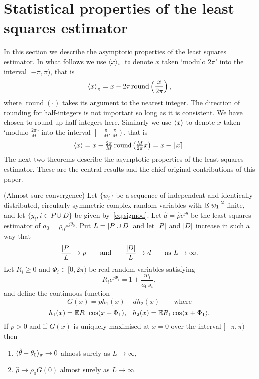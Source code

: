 \documentclass[journal]{IEEEtran}
\begin{document}
\section{Statistical properties of the least squares estimator}\label{sec:stat-prop-least}

In this section we describe the asymptotic properties of the least squares estimator.  In what follows we use $\langle x \rangle_\pi$ to denote $x$ taken `modulo $2\pi$' into the interval $[-\pi, \pi)$, that is
\[
\left\langle x \right\rangle_\pi = x - 2\pi\operatorname{round}\left(\frac{x}{2\pi}\right),
\]
where $\operatorname{round}(\cdot)$ takes its argument to the nearest integer.  The direction of rounding for half-integers is not important so long as it is consistent.  We have chosen to round up half-integers here.  Similarly we use $\langle x \rangle$ to denote $x$ taken `modulo $\tfrac{2\pi}{M}$' into the interval $\left[-\tfrac{\pi}{M}, \tfrac{\pi}{M}\right)$, that is
\[
\left\langle x \right\rangle = x - \tfrac{2\pi}{M}\operatorname{round}\left(\tfrac{M}{2\pi}x\right) = x - {\left\lfloor x \right\rceil}.
\]
The next two theorems describe the asymptotic properties of the least squares estimator.  These are the central results and the chief original contributions of this paper.

\begin{theorem}\label{thm:consistency} (Almost sure convergence)
Let $\{w_i\}$ be a sequence of independent and identically distributed, circularly symmetric complex random variables with ${\mathbb E} {\left\vert w_1 \right\vert}^2$ finite, and let $\{y_i, i \in P \cup D\}$ be given by~\eqref{eq:sigmod}.   Let $\hat{a} = \hat{\rho}e^{j\hat{\theta}}$ be the least squares estimator of $a_0 = \rho_0e^{j\theta_0}$. %
Put $L = {\left\vert P \cup D \right\vert}$ and let ${\left\vert P \right\vert}$ and ${\left\vert D \right\vert}$ increase in such a way that
\[
\frac{{\left\vert P \right\vert}}{L} \rightarrow p \qquad \text{and} \qquad \frac{{\left\vert D \right\vert}}{L} \rightarrow d \qquad \text{as $L \rightarrow \infty$.}
\] 
Let $R_i \geq 0$ and $\Phi_i \in [0,2\pi)$ be real random variables satisfying
\begin{equation}\label{eq:RiandPhii}
R_ie^{j\Phi_i} = 1 + \frac{w_i}{a_0 s_i} ,
\end{equation}
and define the continuous function
\[
G(x) = p h_1(x) + d h_2(x) \qquad \text{where}
\]
\[
h_1(x) = {\mathbb E} R_1 \cos(x + \Phi_1), \;\;\; h_2(x) =  {\mathbb E} R_1 \cos\langle  x + \Phi_1 \rangle.
\]
If $p > 0$ and if $G(x)$ is uniquely maximised at $x = 0$ over the interval $[-\pi,\pi)$ then
\begin{enumerate}
\item $\langle \hat{\theta} - \theta_0 \rangle_\pi \rightarrow 0$ almost surely as $L \rightarrow \infty$,
\item $\hat{\rho} \rightarrow \rho_0 G(0)$ almost surely as $L \rightarrow \infty$.
\end{enumerate}
\end{theorem}
\end{document}

